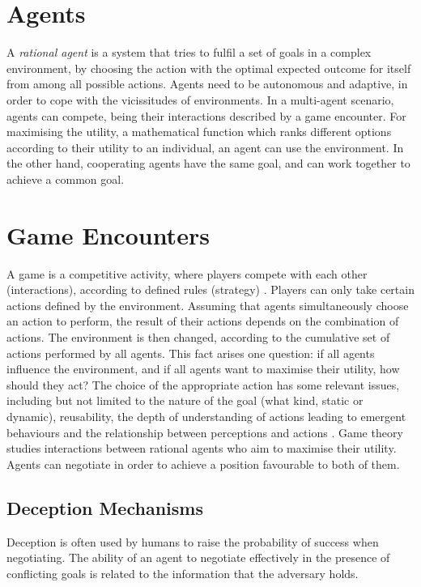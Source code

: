 \section{Agents}
A \textit{rational agent} is a system that tries to fulfil a set of goals in a complex environment, by choosing the action with the optimal expected outcome for itself from among all possible actions. Agents need to be autonomous and adaptive, in order to cope with the vicissitudes of environments. In a multi-agent scenario, agents can compete, being their interactions described by a game encounter. For maximising the utility, a mathematical function which ranks different options according to their utility to an individual, an agent can use the environment. In the other hand, cooperating agents have the same goal, and can work together to achieve a common goal. 
\section{Game Encounters}
A game is a competitive activity, where players compete with each other (interactions), according to defined rules (strategy) \cite{rh}
. Players can only take certain actions defined by the environment.  Assuming that agents simultaneously choose an action to perform, the result of their actions depends on the combination of actions. The environment is then changed, according to the cumulative set of actions performed by all agents. This fact arises one question: if all agents influence the environment, and if all agents want to maximise their utility, how should they act? The choice of the appropriate action has some relevant issues, including but not limited to the nature of the goal (what kind, static or dynamic), reusability, the depth of understanding of actions leading to emergent behaviours and the relationship between perceptions and actions \cite{Maes:1993:MAA:1668014.1668022}. Game theory studies interactions between rational agents who aim to maximise their utility. Agents can negotiate in order to achieve a position favourable to both of them. 

\subsection{Deception Mechanisms}
Deception is often used by humans to raise the probability of success when negotiating. The ability of an agent to negotiate effectively in the presence of conflicting goals is related to the information that the adversary holds. 

